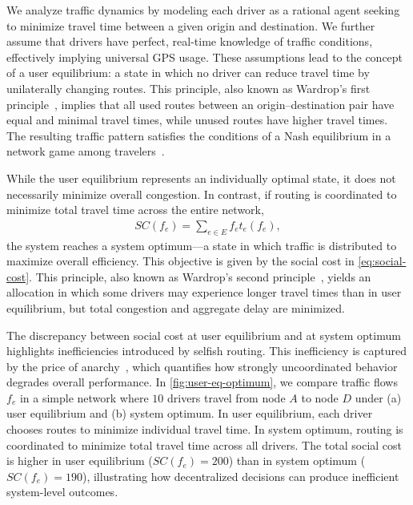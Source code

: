 \documentclass[twocolumn,english,groupedaddress, superscriptaddress,aps,pre,10pt,floatfix]{revtex4-2}
\begin{document}

We analyze traffic dynamics by modeling each driver as a rational agent seeking to minimize travel time between a given origin and destination. We further assume that drivers have perfect, real-time knowledge of traffic conditions, effectively implying universal GPS usage. These assumptions lead to the concept of a user equilibrium: a state in which no driver can reduce travel time by unilaterally changing routes. This principle, also known as Wardrop's first principle~\cite{wardrop1952road}, implies that all used routes between an origin--destination pair have equal and minimal travel times, while unused routes have higher travel times. The resulting traffic pattern satisfies the conditions of a Nash equilibrium in a network game among travelers~\cite{koutsoupias1999worst, roughgarden2002bad}.

While the user equilibrium represents an individually optimal state, it does not necessarily minimize overall congestion. In contrast, if routing is coordinated to minimize total travel time across the entire network,
\begin{align}\label{eq:social-cost}
SC(f_e) = \sum_{e\in E} f_e t_e(f_e),
\end{align}
the system reaches a system optimum---a state in which traffic is distributed to maximize overall efficiency. This objective is given by the social cost in \cref{eq:social-cost}. This principle, also known as Wardrop's second principle~\cite{wardrop1952road}, yields an allocation in which some drivers may experience longer travel times than in user equilibrium, but total congestion and aggregate delay are minimized.

The discrepancy between social cost at user equilibrium and at system optimum highlights inefficiencies introduced by selfish routing. This inefficiency is captured by the price of anarchy~\cite{koutsoupias1999worst}, which quantifies how strongly uncoordinated behavior degrades overall performance. In \cref{fig:user-eq-optimum}, we compare traffic flows $f_e$ in a simple network where $10$ drivers travel from node $A$ to node $D$ under (a) user equilibrium and (b) system optimum. In user equilibrium, each driver chooses routes to minimize individual travel time. In system optimum, routing is coordinated to minimize total travel time across all drivers. The total social cost is higher in user equilibrium ($SC(f_e)=200$) than in system optimum ($SC(f_e)=190$), illustrating how decentralized decisions can produce inefficient system-level outcomes.
\end{document}
